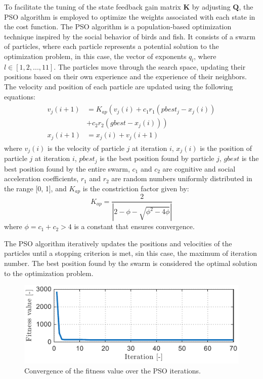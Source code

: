 To facilitate the tuning of the state feedback gain matrix $\mathbf{K}$ by adjusting $\mathbf{Q}$, the PSO algorithm is employed to optimize the weights associated with each state in the cost function. The PSO algorithm is a population-based optimization technique inspired by the social behavior of birds and fish. It consists of a swarm of particles, where each particle represents a potential solution to the optimization problem, in this case, the vector of exponents $q_l$, where $l\in\left[1,2,...,11\right]$. The particles move through the search space, updating their positions based on their own experience and the experience of their neighbors. The velocity and position of each particle are updated using the following equations:
\begin{align}
    \begin{aligned}
        v_j(i + 1) &= K_{ap}\left(v_j(i) + c_1 r_1 (pbest_j - x_j(i)) \right.\\
        & \left. + c_2 r_2 (gbest - x_j(i))\right)\\
        x_j(i + 1) &= x_j(i) + v_j(i + 1)
    \end{aligned}
\end{align}
where $v_j(i)$ is the velocity of particle $j$ at iteration $i$, $x_j(i)$ is the position of particle $j$ at iteration $i$, $pbest_j$ is the best position found by particle $j$, $gbest$ is the best position found by the entire swarm, $c_1$ and $c_2$ are cognitive and social acceleration coefficients, $r_1$ and $r_2$ are random numbers uniformly distributed in the range [0, 1], and $K_{ap}$ is the constriction factor given by:
\begin{equation}
    K_{ap} = \dfrac{2}{\left|2 - \phi - \sqrt{\phi^2 - 4\phi}\right|}
\end{equation}
where $\phi = c_1 + c_2 > 4$ is a constant that ensures convergence.

The PSO algorithm iteratively updates the positions and velocities of the particles until a stopping criterion is met, sin this case, the maximum of iteration number. The best position found by the swarm is considered the optimal solution to the optimization problem.

\begin{figure}[t!]
    \centering
    \includegraphics[]{Images/Fitness_iterations.pdf}
    \caption{Convergence of the fitness value over the PSO iterations.}
    \label{fig:PSO_Fitness}
\end{figure}

